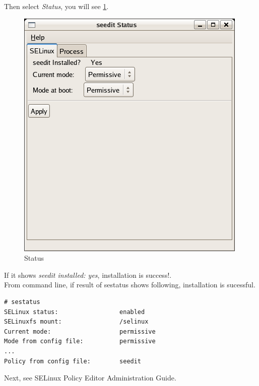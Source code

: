 \documentclass{article}
\begin{document}
Then  select {\it Status}, you will see \ref{fig:status-selinux}.
\begin{figure}
\caption{Status}\label{fig:status-selinux}
\includegraphics{images/status-selinux.png}
\end{figure}
If it shows {\it seedit installed: yes}, installation is success!.\\

From command line, if result of sestatus shows following, installation
is sucessful.
\begin{verbatim}
# sestatus
SELinux status:                 enabled
SELinuxfs mount:                /selinux
Current mode:                   permissive
Mode from config file:          permissive
...
Policy from config file:        seedit	
\end{verbatim}

Next,  see SELinux Policy Editor Administration Guide.
\end{document}

